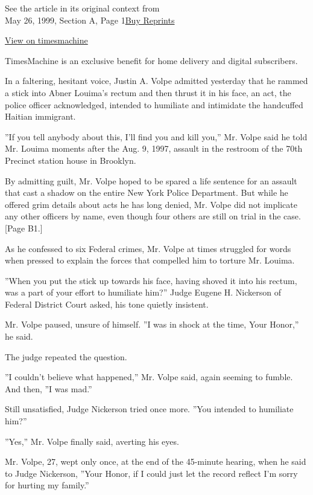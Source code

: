 See the article in its original context from\\
May 26, 1999, Section A, Page
1\href{https://store.nytimes3xbfgragh.onion/collections/new-york-times-page-reprints?utm_source=nytimes\&utm_medium=article-page\&utm_campaign=reprints}{Buy
Reprints}

\href{http://timesmachine.nytimes3xbfgragh.onion/timesmachine/1999/05/26/868671.html}{View
on timesmachine}

TimesMachine is an exclusive benefit for home delivery and digital
subscribers.

In a faltering, hesitant voice, Justin A. Volpe admitted yesterday that
he rammed a stick into Abner Louima's rectum and then thrust it in his
face, an act, the police officer acknowledged, intended to humiliate and
intimidate the handcuffed Haitian immigrant.

''If you tell anybody about this, I'll find you and kill you,'' Mr.
Volpe said he told Mr. Louima moments after the Aug. 9, 1997, assault in
the restroom of the 70th Precinct station house in Brooklyn.

By admitting guilt, Mr. Volpe hoped to be spared a life sentence for an
assault that cast a shadow on the entire New York Police Department. But
while he offered grim details about acts he has long denied, Mr. Volpe
did not implicate any other officers by name, even though four others
are still on trial in the case. {[}Page B1.{]}

As he confessed to six Federal crimes, Mr. Volpe at times struggled for
words when pressed to explain the forces that compelled him to torture
Mr. Louima.

''When you put the stick up towards his face, having shoved it into his
rectum, was a part of your effort to humiliate him?'' Judge Eugene H.
Nickerson of Federal District Court asked, his tone quietly insistent.

Mr. Volpe paused, unsure of himself. ''I was in shock at the time, Your
Honor,'' he said.

The judge repeated the question.

''I couldn't believe what happened,'' Mr. Volpe said, again seeming to
fumble. And then, ''I was mad.''

Still unsatisfied, Judge Nickerson tried once more. ''You intended to
humiliate him?''

''Yes,'' Mr. Volpe finally said, averting his eyes.

Mr. Volpe, 27, wept only once, at the end of the 45-minute hearing, when
he said to Judge Nickerson, ''Your Honor, if I could just let the record
reflect I'm sorry for hurting my family.''

